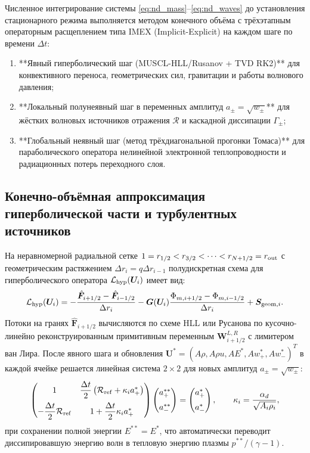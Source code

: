 \documentclass[11pt,a4paper]{article}
\begin{document}
Численное интегрирование системы \eqref{eq:nd_mass}--\eqref{eq:nd_waves} до установления стационарного режима выполняется методом конечного объёма с трёхэтапным операторным расщеплением типа IMEX (Implicit-Explicit) на каждом шаге по времени $\Delta t$:
\begin{enumerate}
\item **Явный гиперболический шаг (MUSCL-HLL/Rusanov + TVD RK2)** для конвективного переноса, геометрических сил, гравитации и работы волнового давления;
\item **Локальный полунеявный шаг в переменных амплитуд $a_\pm = \sqrt{w_\pm}$** для жёстких волновых источников отражения $\mathcal{R}$ и каскадной диссипации $\Gamma_\pm$;
\item **Глобальный неявный шаг (метод трёхдиагональной прогонки Томаса)** для параболического оператора нелинейной электронной теплопроводности и радиационных потерь переходного слоя.
\end{enumerate}

\subsection{Конечно-объёмная аппроксимация гиперболической части и турбулентных источников}

На неравномерной радиальной сетке $1 = r_{1/2} < r_{3/2} < \dots < r_{N+1/2} = r_{\rm out}$ с геометрическим растяжением $\Delta r_i = q\Delta r_{i-1}$ полудискретная схема для гиперболического оператора $\mathcal{L}_{\rm hyp}(\bm{U}_i)$ имеет вид:
\begin{equation}
\mathcal{L}_{\rm hyp}(\bm{U}_i) = -\frac{\hat{\bm{F}}_{i+1/2} - \hat{\bm{F}}_{i-1/2}}{\Delta r_i} - \bm{G}(\bm{U}_i)\frac{\Phi_{m,i+1/2} - \Phi_{m,i-1/2}}{\Delta r_i} + \bm{S}_{{\rm geom},i}.
\label{eq:fvm_hyp}
\end{equation}
Потоки на гранях $\hat{\bm{F}}_{i+1/2}$ вычисляются по схеме HLL или Русанова по кусочно-линейно реконструированным примитивным переменным $\bm{W}_{i+1/2}^{L,R}$ с лимитером ван Лира. После явного шага и обновления $\bm{U}^* = (A\rho, A\rho u, A E^*, A w_+^*, A w_-^*)^T$ в каждой ячейке решается линейная система $2 \times 2$ для новых амплитуд $a_\pm = \sqrt{w_\pm}$:
\begin{equation}
\begin{pmatrix}
1 & \dfrac{\Delta t}{2}\left(\mathcal{R}_{\rm ref} + \kappa_i a_+^*\right) \\[8pt]
-\dfrac{\Delta t}{2}\mathcal{R}_{\rm ref} & 1 + \dfrac{\Delta t}{2}\kappa_i a_+^*
\end{pmatrix}
\begin{pmatrix}
a_+^{**} \\[6pt]
a_-^{**}
\end{pmatrix} =
\begin{pmatrix}
a_+^* \\[6pt]
a_-^*
\end{pmatrix}, \qquad \kappa_i = \frac{\alpha_d}{\sqrt{A_i\rho_i}},
\label{eq:imex_waves_2x2}
\end{equation}
при сохранении полной энергии $E^{**} = E^*$, что автоматически переводит диссипировавшую энергию волн в тепловую энергию плазмы $p^{**}/(\gamma - 1)$.
\end{document}
